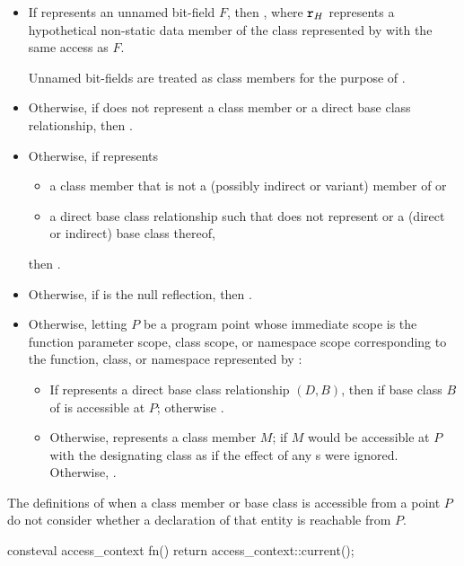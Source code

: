 \begin{itemdescr}
\pnum
\returns
\begin{itemize}
\item
  If  represents an unnamed bit-field $F$,
  then ,
  where $\texttt{\protect r}_H$ represents a hypothetical non-static data member
  of the class represented by 
  with the same access as $F$.
  \begin{note}
  Unnamed bit-fields are treated as class members
  for the purpose of .
  \end{note}
\item
  Otherwise, if  does not represent a class member
  or a direct base class relationship,
  then .
\item
  Otherwise, if  represents
  \begin{itemize}
  \item
    a class member that is not a (possibly indirect or variant)
    member of  or
  \item
    a direct base class relationship such that 
    does not represent 
    or a (direct or indirect) base class thereof,
  \end{itemize}
  then .
\item
  Otherwise, if  is the null reflection,
  then .
\item
  Otherwise, letting $P$ be a program point whose immediate scope is the
  function parameter scope, class scope, or namespace scope
  corresponding to the
  function, class, or namespace
  represented by :
  \begin{itemize}
  \item
    If  represents a direct base class relationship $(D, B)$,
    then  if base class $B$ of 
    is accessible at $P$;
    otherwise .
  \item
    Otherwise,  represents a class member $M$;
     if $M$ would be accessible at $P$
    with the designating class as 
    if the effect of any s were ignored.
    Otherwise, .
  \end{itemize}
\end{itemize}
\begin{note}
The definitions of when a class member or base class is accessible from a point $P$
do not consider whether a declaration of that entity is reachable from $P$.
\end{note}
\begin{example}
\begin{codeblock}
consteval access_context fn() {
  return access_context::current();
}


\end{codeblock}
\end{example}
\end{itemdescr}
